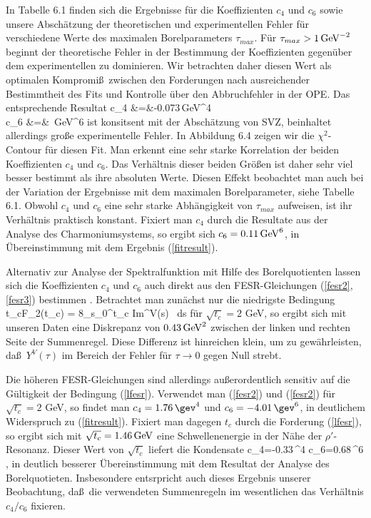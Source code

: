 In Tabelle 6.1 finden sich die Ergebnisse f\"ur die
Koeffizienten $c_4$ und $c_6$ sowie unsere Absch\"atzung der
theoretischen und experimentellen Fehler f\"ur verschiedene
Werte des maximalen Borelparameters $\tau_{max}$. F\"ur
$\tau_{max}>1\,{\rm GeV}^{-2}$ beginnt der theoretische Fehler
in der Bestimmung der Koeffizienten gegen\"uber dem experimentellen
zu dominieren. Wir betrachten daher diesen Wert als optimalen
Kompromi\ss\ zwischen den Forderungen nach ausreichender 
Bestimmtheit des Fits und Kontrolle \"uber den Abbruchfehler
in der OPE. Das entsprechende Resultat
\beq
\label{fitresult}
  c_4 &=&-0.073\,{\rm GeV}^{4} \\   
  c_6 &=& \,{\rm GeV}^{6}
\eeq
ist konsitsent mit der Absch\"atzung von SVZ, beinhaltet allerdings
gro\ss e experimentelle Fehler. In Abbildung 6.4 zeigen wir die
$\chi^2$-Contour f\"ur diesen Fit. Man erkennt eine sehr starke 
Korrelation der beiden Koeffizienten $c_4$ und $c_6$. Das 
Verh\"altnis dieser beiden Gr\"o\ss en ist daher sehr viel besser
bestimmt als ihre absoluten Werte.   Diesen Effekt beobachtet
man auch bei der Variation der Ergebnisse mit dem maximalen 
Borelparameter, siehe Tabelle 6.1. Obwohl $c_4$ und $c_6$ eine
sehr starke Abh\"angigkeit von $\tau_{max}$ aufweisen, ist ihr 
Verh\"altnis praktisch konstant. Fixiert man $c_4$ durch die 
Resultate aus der Analyse des Charmoniumsystems, so ergibt sich
$c_6=0.11\,{\rm GeV}^{6}$, in \"Ubereinstimmung mit dem 
Ergebnis (\ref{fitresult}).

Alternativ zur Analyse der Spektralfunktion mit Hilfe des
Borelquotienten lassen sich die Koeffizienten $c_4$ und $c_6$ 
auch direkt aus den FESR-Gleichungen (\ref{fesr2},\ref{fesr3}) bestimmen
\cite{BDL88}. Betrachtet man zun\"achst nur die niedrigste
Bedingung
\be
\label{lfesr}
 t_cF_2(t_c) = 8\pi \int_{s_0}^{t_c} {\rm Im}\Pi^V(s) \, ds
\ee
f\"ur $\sqrt{t_c}=2$ GeV, so ergibt sich mit unseren Daten eine
Diskrepanz von $0.43\,{\rm GeV}^2$ zwischen der linken und 
rechten Seite der Summenregel. Diese Differenz ist hinreichen klein,
um zu gew\"ahrleisten, da\ss\ $Y^V(\tau)$ im Bereich der Fehler 
f\"ur $\tau\to 0$ gegen Null strebt. 

Die h\"oheren FESR-Gleichungen sind allerdings au\ss erordentlich 
sensitiv auf die G\"ultigkeit der Bedingung (\ref{lfesr}). 
Verwendet man (\ref{fesr2}) und (\ref{fesr2}) f\"ur $\sqrt{t_c}=2$
GeV, so findet man $c_4= 1.76\,\gev^4$ und $c_6= -4.01\,\gev^6$, 
in deutlichem Widerspruch zu (\ref{fitresult}). Fixiert man dagegen 
$t_c$ durch die Forderung (\ref{lfesr}), so ergibt sich mit $\sqrt{t_c}=
1.46\,{\rm GeV}$ eine Schwellenenergie in der N\"ahe der $\rho'$-Resonanz.
Dieser Wert von $\sqrt{t_c}$ liefert die Kondensate 
\be
c_4=-0.33\,\gev^4 \hspace{1cm} c_6=0.68\,\gev^6 ,
\ee
in deutlich besserer \"Ubereinstimmung mit dem Resultat
der Analyse des Borelquotieten. Insbesondere entsrpricht auch dieses
Ergebnis unserer Beobachtung, da\ss\ die verwendeten Summenregeln
im wesentlichen das Verh\"altnis $c_4/c_6$ fixieren.

